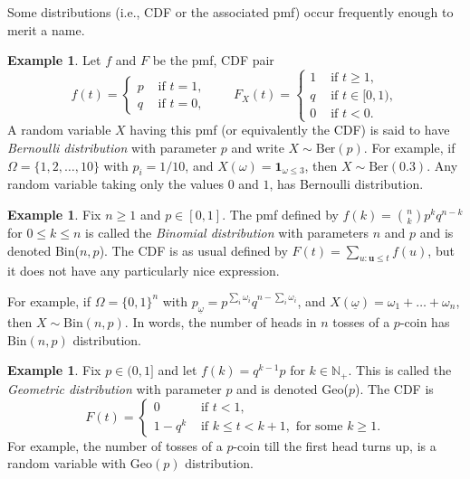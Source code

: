 \documentclass[preprint,  11pt]{amsart}
\def\ome{\omega}
\renewcommand\u{\mathbf{u}}
\theoremstyle{plain} %
\theoremstyle{definition} %
\newtheorem{example}[theorem]{Example}
\begin{document}
Some distributions (i.e., CDF or the associated pmf) occur frequently enough to merit a name.

\begin{example} Let $f$ and $F$ be the pmf, CDF pair 
$$
f(t)=\begin{cases}p & \mbox{ if }t=1, \\ q & \mbox{ if }t=0, \end{cases} \qquad F_{X}(t)=\begin{cases} 1 &\mbox{ if } t\ge 1, \\ q & \mbox{ if }t\in [0,1), \\ 0 & \mbox{ if }t< 0. \end{cases}
$$ 
A random variable $X$ having this pmf (or equivalently the CDF) is said to have {\em Bernoulli distribution} with parameter $p$ and  write $X\sim \mbox{Ber}(p)$. For example, if $\Omega=\{1,2,\ldots ,10\}$ with $p_{i}=1/10$, and $X(\omega)={\mathbf 1}_{\omega\le 3}$, then $X\sim \mbox{Ber}(0.3)$. Any random variable taking only the values $0$ and $1$, has Bernoulli distribution.
\end{example}

\begin{example}  Fix $n\ge 1$ and $p\in [0,1]$. The pmf defined by $f(k)=\binom{n}{k}p^{k}q^{n-k}$ for $0\le k\le n$ is called the {\em Binomial  distribution} with parameters $n$ and $p$ and is denoted Bin($n,p$). The CDF is as usual defined by $F(t)=\sum_{u:\u\le t}f(u)$, but it does not have any particularly nice expression. 

For example, if $\Omega=\{0,1\}^{n}$ with $p_{\underline{\ome}}=p^{\sum_{i}\omega_{i}}q^{n-\sum_{i}\omega_{i}}$, and $X(\underline{\ome})=\omega_{1}+\ldots +\omega_{n}$, then $X\sim \mbox{Bin}(n,p)$. In words, the number of heads in $n$ tosses of a $p$-coin has $\mbox{Bin}(n,p)$ distribution.
\end{example}

\begin{example} Fix $p\in (0,1]$ and let $f(k)=q^{k-1}p$ for $k\in \mathbb{N}_{+}$. This is called the {\em Geometric  distribution} with parameter $p$ and is denoted Geo($p$). The CDF is
$$
F(t) = \begin{cases}
0 & \mbox{ if } t<1, \\
1-q^{k} & \mbox{ if } k\le t<k+1, \mbox{ for some }k\ge 1.
\end{cases}
$$
For example, the number of tosses of a $p$-coin till the first head turns up, is a random variable with $\mbox{Geo}(p)$ distribution.
\end{example} 
\end{document}
